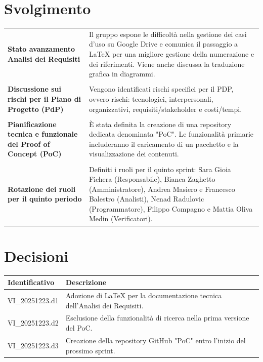 \documentclass[a4paper,12pt]{article}
\begin{document}
\section{Svolgimento}
\begin{longtable}{p{5cm}|p{10cm}}
\textbf{Stato avanzamento Analisi dei Requisiti} & Il gruppo espone le difficoltà nella gestione dei casi d'uso su Google Drive e comunica il passaggio a LaTeX per una migliore gestione della numerazione e dei riferimenti. Viene anche discussa la traduzione grafica in diagrammi. \\\\

\textbf{Discussione sui rischi per il Piano di Progetto (PdP)} & Vengono identificati rischi specifici per il PDP, ovvero rischi: tecnologici, interpersonali, organizzativi, requisiti/stakeholder e costi/tempi. \\\\

\textbf{Pianificazione tecnica e funzionale del Proof of Concept (PoC)} & È stata definita la creazione di una repository dedicata denominata "PoC". Le funzionalità primarie includeranno il caricamento di un pacchetto e la visualizzazione dei contenuti. \\\\

\textbf{Rotazione dei ruoli per il quinto periodo} & Definiti i ruoli per il quinto sprint: Sara Gioia Fichera (Responsabile), Bianca Zaghetto (Amministratore), Andrea Masiero e Francesco Balestro (Analisti), Nenad Radulovic (Programmatore), Filippo Compagno e Mattia Oliva Medin (Verificatori). \\
\end{longtable}

\section{Decisioni}
\begin{tabularx}{\textwidth}{|l|X|}
    \hline
    \textbf{Identificativo} & \textbf{Descrizione} \\
    \hline
    VI\_20251223.d1 & Adozione di LaTeX per la documentazione tecnica dell'Analisi dei Requisiti. \\
    \hline
    VI\_20251223.d2 & Esclusione della funzionalità di ricerca nella prima versione del PoC. \\
    \hline
    VI\_20251223.d3 & Creazione della repository GitHub "PoC" entro l'inizio del prossimo sprint. \\
    \hline
\end{tabularx}
\end{document}
